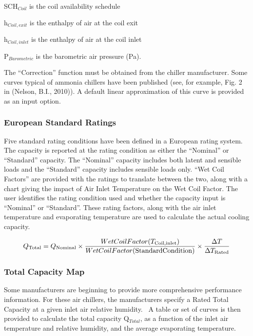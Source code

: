 SCH\(_{Coil}\) is the coil availability schedule

h\(_{Coil,exit}\) is the enthalpy of air at the coil exit

h\(_{Coil,inlet}\) is the enthalpy of air at the coil inlet

P\(_{Barometric}\) is the barometric air pressure (Pa).

The ``Correction'' function must be obtained from the chiller manufacturer. Some curves typical of ammonia chillers have been published (see, for example, Fig. 2 in (Nelson, B.I., 2010)). A default linear approximation of this curve is provided as an input option.

\subsubsection{European Standard Ratings}\label{european-standard-ratings}

Five standard rating conditions have been defined in a European rating system. The capacity is reported at the rating condition as either the ``Nominal'' or ``Standard'' capacity. The ``Nominal'' capacity includes both latent and sensible loads and the ``Standard'' capacity includes sensible loads only. ``Wet Coil Factors'' are provided with the ratings to translate between the two, along with a chart giving the impact of Air Inlet Temperature on the Wet Coil Factor. The user identifies the rating condition used and whether the capacity input is ``Nominal'' or ``Standard''. These rating factors, along with the air inlet temperature and evaporating temperature are used to calculate the actual cooling capacity.

\begin{equation}
{Q_{{\rm{Total}}}} = {Q_{{\rm{Nominal}}}} \times \frac{{WetCoilFactor({T_{{\rm{Coil,inlet}}}})}}{{WetCoilFactor({\rm{Standard Condition}})}} \times \frac{{\Delta T}}{{\Delta {T_{{\rm{Rated}}}}}}
\end{equation}

\subsubsection{Total Capacity Map}\label{total-capacity-map}

Some manufacturers are beginning to provide more comprehensive performance information. For these air chillers, the manufacturers specify a Rated Total Capacity at a given inlet air relative humidity.~ A table or set of curves is then provided to calculate the total capacity Q\(_{Total}\), as a function of the inlet air temperature and relative humidity, and the average evaporating temperature.

